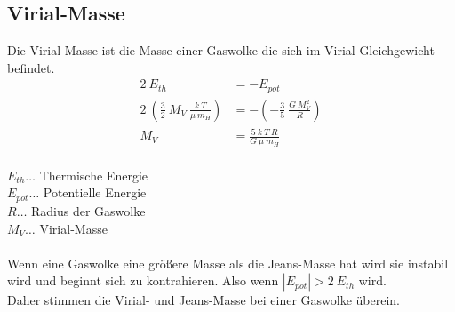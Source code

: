 \subsection{Virial-Masse}
Die Virial-Masse ist die Masse einer Gaswolke die sich im Virial-Gleichgewicht befindet.
\begin{align}
2~E_{th} &= -E_{pot}\nonumber\\
2~(\frac{3}{2}~M_V~\frac{k~T}{\mu~m_H}) &= -(-\frac{3}{5}~\frac{G~M_V^2}{R})\\
M_V &= \frac{5~k~T~R}{G~\mu~m_H}\nonumber
\end{align}
\\
\(E_{th}\dots\) Thermische Energie\\
\(E_{pot}\dots\) Potentielle Energie\\
\(R\dots\) Radius der Gaswolke\\
\(M_V\dots\) Virial-Masse\\
\\
Wenn eine Gaswolke eine grö\ss ere Masse als die Jeans-Masse hat wird sie instabil wird und beginnt sich zu kontrahieren. 
Also wenn \(|E_{pot}| > 2~E_{th}\) wird.\\
Daher stimmen die Virial- und Jeans-Masse bei einer Gaswolke überein.
